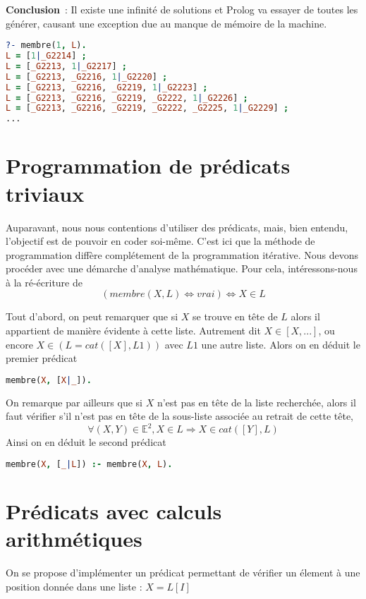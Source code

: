 \textbf{Conclusion}~: Il existe une infinité de solutions et Prolog va essayer
de toutes les générer, causant une exception due au manque de mémoire de la
machine.

\begin{lstlisting}[language=Prolog,frame=single]
?- membre(1, L).
L = [1|_G2214] ;
L = [_G2213, 1|_G2217] ;
L = [_G2213, _G2216, 1|_G2220] ;
L = [_G2213, _G2216, _G2219, 1|_G2223] ;
L = [_G2213, _G2216, _G2219, _G2222, 1|_G2226] ;
L = [_G2213, _G2216, _G2219, _G2222, _G2225, 1|_G2229] ;
...
\end{lstlisting}


\section{Programmation de prédicats triviaux}

Auparavant, nous nous contentions d'utiliser des prédicats, mais, bien entendu,
l'objectif est de pouvoir en coder soi-même. C'est ici que la méthode de programmation diffère
complétement de la programmation itérative. Nous devons procéder avec une démarche
d'analyse mathématique. Pour cela, intéressons-nous à la ré-écriture de
\[(membre(X, L) \Leftrightarrow vrai) \Leftrightarrow X \in L\]

Tout d'abord, on peut remarquer que si $X$ se trouve en tête de $L$ alors il appartient de manière évidente à cette liste. Autrement dit $X \in [X, ...]$, ou encore
$X \in (L = cat([X], L1))$ avec $L1$ une autre liste. Alors on en déduit le
premier prédicat 
\begin{lstlisting}[language=Prolog,frame=single]
membre(X, [X|_]).
\end{lstlisting}

On remarque par ailleurs que si $X$ n'est pas en tête de la liste recherchée, alors il faut vérifier s'il n'est pas en tête de la sous-liste associée au retrait de cette tête, 
\[\forall (X, Y) \in \mathbb{E}^2, X \in L \Rightarrow X \in cat([Y], L)\]
Ainsi on en déduit le second prédicat
\begin{lstlisting}[language=Prolog,frame=single]
membre(X, [_|L]) :- membre(X, L).
\end{lstlisting}


\section{Prédicats avec calculs arithmétiques}

On se propose d'implémenter un prédicat permettant de vérifier un élement à une
position donnée dans une liste : $X = L[I]$

